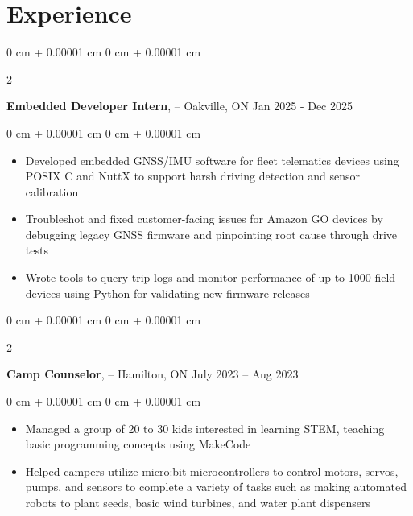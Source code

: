 \documentclass[10pt, letterpaper]{article}
\newenvironment{highlights}{
    \begin{itemize}[
        topsep=0.10 cm,
        parsep=0.10 cm,
        partopsep=0pt,
        itemsep=0pt,
        leftmargin=0 cm + 10pt
    ]
}{
    \end{itemize}
} %
\newenvironment{onecolentry}{
    \begin{adjustwidth}{
        0 cm + 0.00001 cm
    }{
        0 cm + 0.00001 cm
    }
}{
    \end{adjustwidth}
} %
\newenvironment{twocolentry}[2][]{
    \onecolentry
    \def\secondColumn{#2}
    \setcolumnwidth{\fill, 4.5 cm}
    \begin{paracol}{2}
}{
    \switchcolumn \raggedleft \secondColumn
    \end{paracol}
    \endonecolentry
} %
\newcommand{\customref}[3][primaryColor]{\href{#2}{\color{#1}{\underline{#3}}}}
\begin{document}
    
    \section{Experience}

        \begin{twocolentry} {
            {Jan 2025 - Dec 2025}
        }
            \textbf{Embedded Developer Intern}, \textbf{\customref[blue]{https://www.geotab.com/}{Geotab}} -- Oakville, ON\end{twocolentry}

        \vspace{0.10 cm}
        \begin{onecolentry}
            \begin{highlights}
                \item Developed embedded GNSS/IMU software for fleet telematics devices using POSIX C and NuttX to support harsh driving detection and sensor calibration
                \item Troubleshot and fixed customer-facing issues for Amazon GO devices by debugging legacy GNSS firmware and pinpointing root cause through drive tests
                \item Wrote tools to query trip logs and monitor performance of up to 1000 field devices using Python for validating new firmware releases
            \end{highlights}
        \end{onecolentry}

        \vspace{0.2 cm}
        
        \begin{twocolentry}{
            July 2023 – Aug 2023
        }
            \textbf{Camp Counselor}, \textbf{\customref[blue]{https://stemcamp.ca/}{STEM Camp}} -- Hamilton, ON\end{twocolentry}

        \vspace{0.10 cm}
        \begin{onecolentry}
            \begin{highlights}
                \item Managed a group of 20 to 30 kids interested in learning STEM, teaching basic programming concepts using MakeCode
                \item Helped campers utilize micro:bit microcontrollers to control motors, servos, pumps, and sensors to complete a variety of tasks such as making automated robots to plant seeds, basic wind turbines, and water plant dispensers
            \end{highlights}
        \end{onecolentry}
\end{document}
